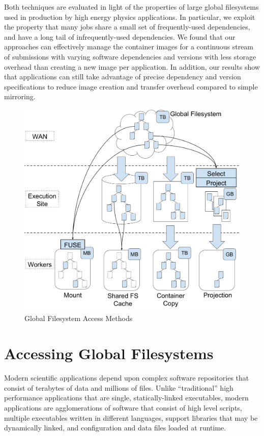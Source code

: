 \documentclass[sigconf]{acmart}
\begin{document}
Both techniques are evaluated in light of the properties
of large global filesystems used in production by high
energy physics applications.  In particular, we exploit the
property that many jobs share a small set of frequently-used
dependencies, and have a long tail of infrequently-used dependencies.
We found that our approaches can effectively manage the container images for a continuous stream of submissions with varying software dependencies and versions with less storage overhead than creating a new image per application.
In addition, our results show that applications can still take advantage of precise dependency and version specifications to reduce image creation and transfer overhead compared to simple mirroring.


\begin{figure}
\includegraphics[width=\linewidth]{drawings/methods.pdf}
\caption{Global Filesystem Access Methods}
\label{fig:choices}
\end{figure}

\section{Accessing Global Filesystems}

Modern scientific applications depend upon complex software
repositories that consist of terabytes of data and millions of files.
Unlike ``traditional'' high performance applications that are
single, statically-linked executables, modern applications are
agglomerations of software that consist of high level scripts,
multiple executables written in different languages, support
libraries that may be dynamically linked, and configuration and
data files loaded at runtime.~\cite{casestudy-poster-chep-2015}
\end{document}

